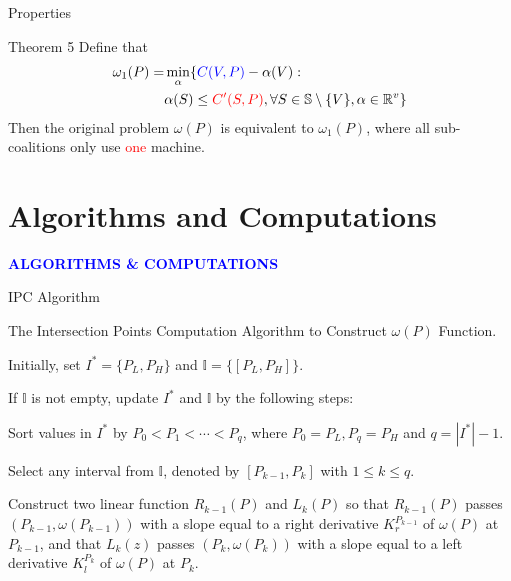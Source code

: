 \documentclass[14pt]{beamer}
\begin{document}
\begin{frame}{Properties}
	\vspace{-1mm}
	\small
		\begin{block}{Theorem 5}
			Define that
			\begin{eqnarray*}
			{\omega_1(P)}=&\mathop{\min}_{\alpha}\{\textcolor{blue}{C(V,P)}-\alpha(V): \\
			&\alpha(S)\leq \textcolor{red}{C'(S,P)},\forall S \in \mathbb{S} \setminus \{V\}, \alpha\in\mathbb{R}^{v}\}
			\end{eqnarray*}
			Then the original problem $\omega(P)$ is equivalent to $\omega_1(P)$, where all sub-coalitions only use \textcolor{red}{one} machine.
		\end{block}
\end{frame}


\section{Algorithms and Computations}
\begin{frame}
\centering
\large
\textcolor{blue}{\bf {\huge A}LGORITHMS \&  {\huge C}OMPUTATIONS}
\end{frame}

\begin{frame}{IPC Algorithm}
	\vspace{-3mm}
	\begin{block}
	{The Intersection Points Computation Algorithm to Construct $\omega(P)$ Function.}
	\end{block}
	\begin{description}
	\justifying
	\footnotesize
	\vspace{3mm}
	\item[Step 1.] Initially, set $I^*=\{P_L,P_H\}$ and $\mathbb{I}= \{[P_L,P_H]\}$.
  \item[Step 2.] If $\mathbb{I}$ is not empty, update $I^*$ and $\mathbb{I}$ by the following steps:
  \item[Step 3.] Sort values in $I^*$ by $P_0<P_1<\cdots<P_q$, where $P_0 = P_L,P_q = P_H$ and $q = |I^*|-1$.
  \item[Step 4.]
  Select any interval from $\mathbb{I}$, denoted by $[P_{k-1},P_{k}]$ with $1\leq k \leq q$.
	\item[Step 5.]
	Construct two linear function $ R_{k-1}(P)$ and $ L_{k}(P)$ so that $ R_{k-1}(P)$ passes $(P_{k-1},\omega(P_{k-1}))$ with a slope equal to a right derivative $K_{r}^{P_{k-1}}$ of $\omega(P)$ at $P_{k-1}$, and that $L_{k}(z)$ passes $(P_{k},\omega(P_{k}))$ with a slope equal to a left derivative $K_{l}^{P_{k}}$ of $\omega(P)$ at $P_k$.
	\end{description}
\end{frame}
\end{document}
